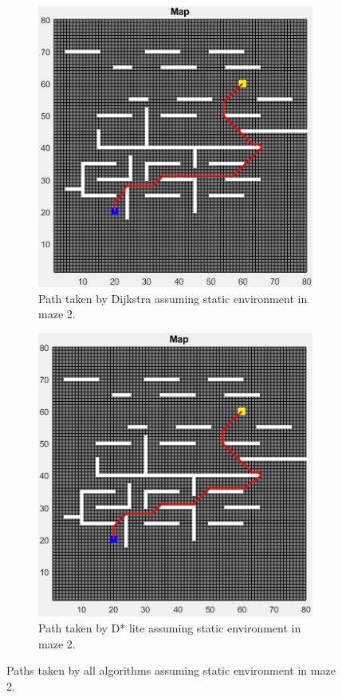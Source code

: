 \begin{figure}
\begin{subfigure}[t]{0.32\columnwidth}
		\includegraphics[width=\textwidth]{images/dijkstra_static_maze_2.png}
		\caption{Path taken by Dijkstra assuming static environment in maze 2.}
        \label{fig:dijkstra_static_path_maze_2}
	\end{subfigure}
    \hfill
    \begin{subfigure}[t]{0.32\columnwidth}
		\centering
		\includegraphics[width=\textwidth]{images/d_star_lite_static_maze_2.png}
		\caption{Path taken by D* lite assuming static environment in maze 2.}
        \label{fig:d_star_static_path_maze_2}
	\end{subfigure}
	\caption{Paths taken by all algorithms assuming static environment in maze 2.}
    \label{fig:static_path_maze_2}
\end{figure}

